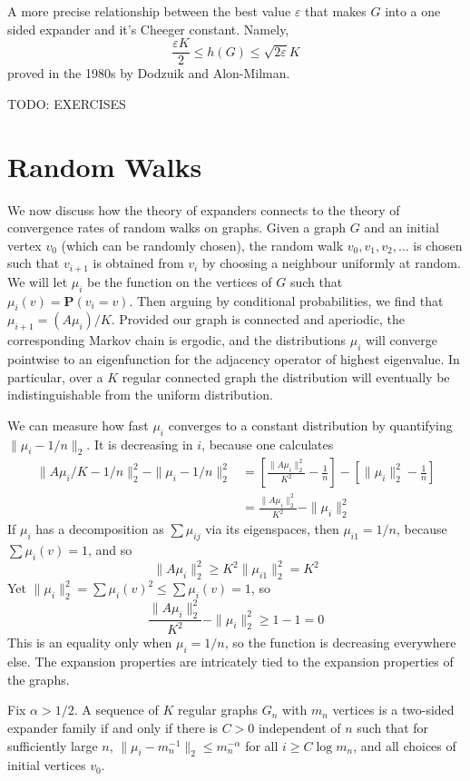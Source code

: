 A more precise relationship between the best value $\varepsilon$ that makes $G$ into a one sided expander and it's Cheeger constant. Namely,
%
\[ \frac{\varepsilon K}{2} \leq h(G) \leq \sqrt{2 \varepsilon} K \]
%
proved in the 1980s by Dodzuik and Alon-Milman.

TODO: EXERCISES

\section{Random Walks}

We now discuss how the theory of expanders connects to the theory of convergence rates of random walks on graphs. Given a graph $G$ and an initial vertex $v_0$ (which can be randomly chosen), the random walk $v_0, v_1, v_2, \dots$ is chosen such that $v_{i+1}$ is obtained from $v_i$ by choosing a neighbour uniformly at random. We will let $\mu_i$ be the function on the vertices of $G$ such that $\mu_i(v) = \mathbf{P}(v_i = v)$. Then arguing by conditional probabilities, we find that $\mu_{i+1} = (A\mu_i)/K$. Provided our graph is connected and aperiodic, the corresponding Markov chain is ergodic, and the distributions $\mu_i$ will converge pointwise to an eigenfunction for the adjacency operator of highest eigenvalue. In particular, over a $K$ regular connected graph the distribution will eventually be indistinguishable from the uniform distribution.

We can measure how fast $\mu_i$ converges to a constant distribution by quantifying $\| \mu_i - 1/n \|_2$. It is decreasing in $i$, because one calculates
%
\begin{align*}
    \| A\mu_i/K - 1/n \|_2^2 - \| \mu_i - 1/n \|_2^2 &= \left[ \frac{\| A\mu_i \|_2^2}{K^2} - \frac{1}{n} \right] - \left[ \| \mu_i \|_2^2 - \frac{1}{n} \right]\\
    &= \frac{\| A \mu_i \|_2^2}{K^2} - \| \mu_i \|_2^2
\end{align*}
%
If $\mu_i$ has a decomposition as $\sum \mu_{ij}$ via its eigenspaces, then $\mu_{i1} = 1/n$, because $\sum \mu_i(v) = 1$, and so
%
\[ \| A \mu_i \|_2^2 \geq K^2 \| \mu_{i1} \|^2_2 = K^2 \]
%
Yet $\| \mu_i \|_2^2 = \sum \mu_i(v)^2 \leq \sum \mu_i(v) = 1$, so
%
\[ \frac{\| A\mu_i \|_2^2}{K^2} - \| \mu_i \|_2^2 \geq 1 - 1 = 0 \]
%
This is an equality only when  $\mu_i = 1/n$, so the function is decreasing everywhere else. The expansion properties are intricately tied to the expansion properties of the graphs.

\begin{theorem}
    Fix $\alpha > 1/2$. A sequence of $K$ regular graphs $G_n$ with $m_n$ vertices is a two-sided expander family if and only if there is $C > 0$ independent of $n$ such that for sufficiently large $n$, $\| \mu_i - m_n^{-1} \|_2 \leq m_n^{-\alpha}$ for all $i \geq C \log m_n$, and all choices of initial vertices $v_0$.
\end{theorem}

